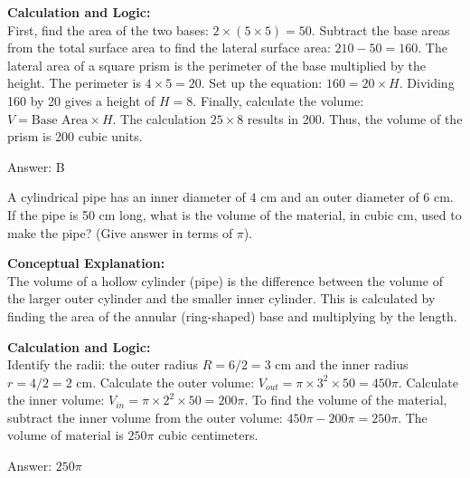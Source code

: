\documentclass[11pt,paper=a4,answers]{exam}
\begin{document}
\begin{questions}
\begin{solution}
\vspace{30pt}

\textbf{Calculation and Logic:} \\
First, find the area of the two bases: $2 \times (5 \times 5) = 50$. Subtract the base areas from the total surface area to find the lateral surface area: $210 - 50 = 160$. The lateral area of a square prism is the perimeter of the base multiplied by the height. The perimeter is $4 \times 5 = 20$. Set up the equation: $160 = 20 \times H$. Dividing 160 by 20 gives a height of $H = 8$. Finally, calculate the volume: $V = \text{Base Area} \times H$. The calculation $25 \times 8$ results in 200. Thus, the volume of the prism is 200 cubic units.

\vspace{30pt}

Answer: \colorbox{yellow!100}{B}
\end{solution}

\vspace{60pt}

\question
A cylindrical pipe has an inner diameter of 4 cm and an outer diameter of 6 cm. If the pipe is 50 cm long, what is the volume of the material, in cubic cm, used to make the pipe? (Give answer in terms of $\pi$).

\begin{solution}
\textbf{Conceptual Explanation:} \\
The volume of a hollow cylinder (pipe) is the difference between the volume of the larger outer cylinder and the smaller inner cylinder. This is calculated by finding the area of the annular (ring-shaped) base and multiplying by the length.

\vspace{30pt}

\textbf{Calculation and Logic:} \\
Identify the radii: the outer radius $R = 6 / 2 = 3$ cm and the inner radius $r = 4 / 2 = 2$ cm. Calculate the outer volume: $V_{out} = \pi \times 3^2 \times 50 = 450\pi$. Calculate the inner volume: $V_{in} = \pi \times 2^2 \times 50 = 200\pi$. To find the volume of the material, subtract the inner volume from the outer volume: $450\pi - 200\pi = 250\pi$. The volume of material is $250\pi$ cubic centimeters.

\vspace{30pt}

Answer: \colorbox{yellow!100}{$250\pi$}
\end{solution}


\end{questions}
\end{document}
